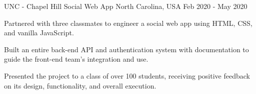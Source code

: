 \begin{cventries}
  \cventry
    {UNC - Chapel Hill} %
    {Social Web App} %
    {North Carolina, USA} %
    {Feb 2020 - May 2020} %
    {
      \begin{cvitems} %
        \item {Partnered with three classmates to engineer a social web app using HTML, CSS, and vanilla JavaScript.}
        \item {Built an entire back-end API and authentication system with documentation to guide the front-end team's integration and use.}
        \item {Presented the project to a class of over 100 students, receiving positive feedback on its design, functionality, and overall execution.}
      \end{cvitems}
    }





\end{cventries}
